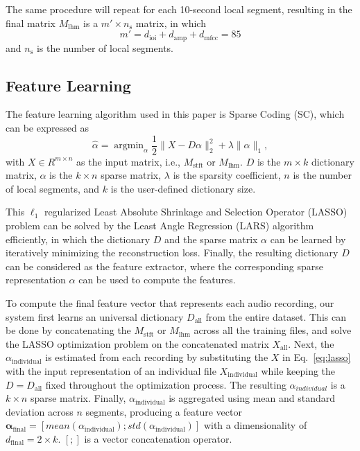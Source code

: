 \documentclass{ws-ijsc}
\begin{document}
The same procedure will repeat for each 10-second local segment, resulting in the final matrix $M_\mathrm{lhm}$ is a $m' \times n_\mathrm{s}$ matrix,  in which 
\begin{equation}
    m' = d_\mathrm{ioi} + d_\mathrm{amp} + d_\mathrm{mfcc} = 85
\end{equation}%
and $n_\mathrm{s}$ is the number of local segments.


\subsection{Feature Learning}\label{subsec:feat_learn}
The feature learning algorithm used in this paper is Sparse Coding (SC), which can be expressed as %
\begin{equation}\label{eq:lasso}
\hat{\alpha} = \mathop{\mathrm{argmin}}_\alpha \frac{1}{2} \| X - D\alpha \|_{2}^{2} + \lambda \| \alpha \|_{1}, 
\end{equation}
%
with $X \in R^{ m \times n}$ as the input matrix, i.e., $M_\mathrm{stft}$ or $M_\mathrm{lhm}$. $D$ is the $m \times k$ dictionary matrix, $\alpha$ is the $k \times n$ sparse matrix, $\lambda$ is the sparsity coefficient, $n$ is the number of local segments, and $k$ is the user-defined dictionary size. 

This $\ell_1$ regularized Least Absolute Shrinkage and Selection Operator (LASSO) problem can be solved by the Least Angle Regression (LARS) algorithm efficiently\cite{Efron2004}, in which the dictionary $D$ and the sparse matrix $\alpha$ can be learned by iteratively minimizing the reconstruction loss. Finally, the resulting dictionary $D$ can be considered as the feature extractor, where the corresponding sparse representation $\alpha$ can be used to compute the features. 

To compute the final feature vector that represents each audio recording, our system first learns an universal dictionary $D_\mathrm{all}$ from the entire dataset. This can be done by concatenating the $M_\mathrm{stft}$ or $M_\mathrm{lhm}$ across all the training files, and solve the LASSO optimization problem on the concatenated matrix $X_\mathrm{all}$. %
Next, the $\alpha_\mathrm{individual}$ is estimated from each recording by substituting the $X$ in Eq.~\ref{eq:lasso} with the input representation of an individual file $X_\mathrm{individual}$ while keeping the $D = D_\mathrm{all}$ fixed throughout the optimization process. The resulting $\alpha_{individual}$ is a $k \times n$ sparse matrix. Finally, $\alpha_\mathrm{individual}$ is aggregated using mean and standard deviation across $n$ segments, producing a feature vector $\mathbf{\alpha_\mathrm{final}} = [mean(\alpha_\mathrm{individual}); std(\alpha_\mathrm{individual})]$ with a dimensionality of $d_\mathrm{final} = 2 \times k$. $[ ; ]$ is a vector concatenation operator.
\end{document}

